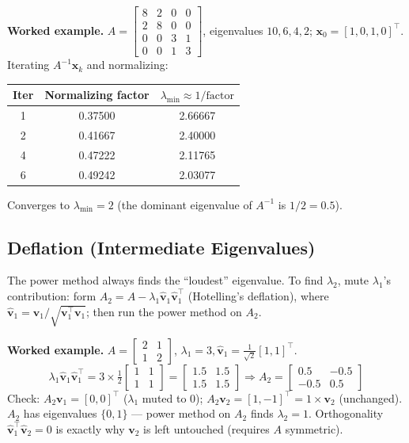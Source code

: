 \begin{examplebox}
\textbf{Worked example.} $A=\begin{bmatrix}8&2&0&0\\2&8&0&0\\0&0&3&1\\0&0&1&3\end{bmatrix}$, eigenvalues $10,6,4,2$; $\mathbf x_0=[1,0,1,0]^\top$. Iterating $A^{-1}\mathbf x_k$ and normalizing:
\begin{center}\small
\begin{tabular}{@{}ccc@{}}
\toprule
Iter & Normalizing factor & $\lambda_{\min}\approx1/\text{factor}$\\
\midrule
1 & 0.37500 & 2.66667\\
2 & 0.41667 & 2.40000\\
4 & 0.47222 & 2.11765\\
6 & 0.49242 & 2.03077\\
\bottomrule
\end{tabular}
\end{center}
Converges to $\lambda_{\min}=2$ (the dominant eigenvalue of $A^{-1}$ is $1/2=0.5$).
\end{examplebox}

\subsection{Deflation (Intermediate Eigenvalues)}

\begin{defbox}
The power method always finds the ``loudest'' eigenvalue. To find $\lambda_2$, mute $\lambda_1$'s contribution: form $A_2=A-\lambda_1\hat{\mathbf v}_1\hat{\mathbf v}_1^\top$ (Hotelling's deflation), where $\hat{\mathbf v}_1=\mathbf v_1/\sqrt{\mathbf v_1^\top\mathbf v_1}$; then run the power method on $A_2$.
\end{defbox}

\begin{examplebox}
\textbf{Worked example.} $A=\begin{bmatrix}2&1\\1&2\end{bmatrix}$, $\lambda_1=3,\hat{\mathbf v}_1=\tfrac1{\sqrt2}[1,1]^\top$.
\[
\lambda_1\hat{\mathbf v}_1\hat{\mathbf v}_1^\top = 3\times\tfrac12\begin{bmatrix}1&1\\1&1\end{bmatrix}=\begin{bmatrix}1.5&1.5\\1.5&1.5\end{bmatrix} \Rightarrow A_2 = \begin{bmatrix}0.5&-0.5\\-0.5&0.5\end{bmatrix}
\]
Check: $A_2\mathbf v_1=[0,0]^\top$ ($\lambda_1$ muted to 0); $A_2\mathbf v_2=[1,-1]^\top=1\times\mathbf v_2$ (unchanged). $A_2$ has eigenvalues $\{0,1\}$ — power method on $A_2$ finds $\lambda_2=1$. Orthogonality $\hat{\mathbf v}_1^\top\hat{\mathbf v}_2=0$ is exactly why $\mathbf v_2$ is left untouched (requires $A$ symmetric).
\end{examplebox}

